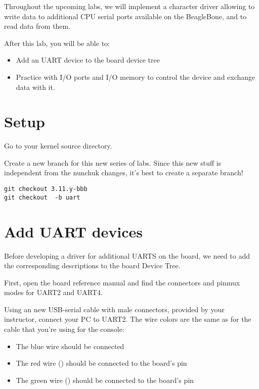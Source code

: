 
Throughout the upcoming labs, we will implement a character driver
allowing to write data to additional CPU serial ports available on 
the BeagleBone, and to read data from them.

After this lab, you will be able to:

\begin{itemize}
\item Add an UART device to the board device tree
\item Practice with I/O ports and I/O memory to control the device and
  exchange data with it.
\end{itemize}

\section{Setup}

Go to your kernel source directory.

Create a new branch for this new series of labs. Since this new stuff
is independent from the nunchuk changes, it's best to create a separate
branch!

\begin{verbatim}
git checkout 3.11.y-bbb
git checkout  -b uart
\end{verbatim}

\section{Add UART devices}

Before developing a driver for additional UARTS on the board, we
need to add the corresponding descriptions to the board Device Tree.

First, open the board reference manual and find the connectors
and pinmux modes for UART2 and UART4.

Using an new USB-serial cable with male connectors, provided by your
instructor, connect your PC to UART2. The wire colors are the same
as for the cable that you're using for the console:

\begin{itemize}
\item The blue wire should be connected  
\item The red wire () should be connected to the board's  pin
\item The green wire () should be connected to the board's  pin
\end{itemize}

